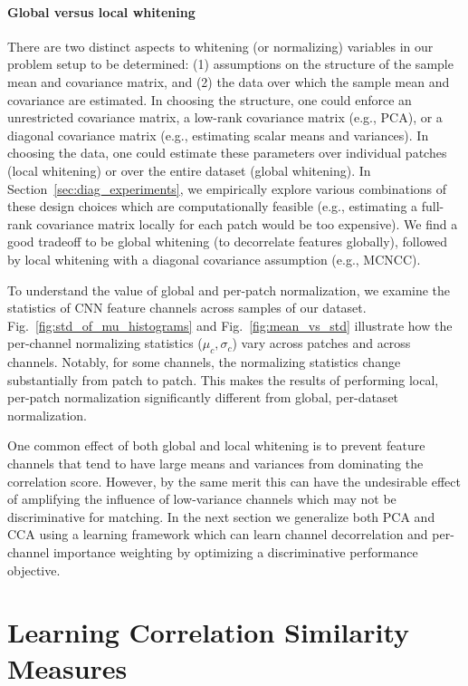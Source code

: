 \documentclass[twocolumn]{svjour3}           %
\begin{document}
\paragraph{Global versus local whitening}
There are two distinct aspects to whitening (or normalizing) variables in our
problem setup to be determined: (1) assumptions on the structure of the sample
mean and covariance matrix, and (2) the data over which the sample mean and
covariance are estimated. In choosing the structure, one could enforce an
unrestricted covariance matrix, a low-rank covariance matrix (e.g., PCA), or a
diagonal covariance matrix (e.g., estimating scalar means and variances).  In
choosing the data, one could estimate these parameters over individual patches
(local whitening) or over the entire dataset (global whitening). In
Section~\ref{sec:diag_experiments}, we empirically explore various combinations
of these design choices which are computationally feasible (e.g., estimating a
full-rank covariance matrix locally for each patch would be too expensive).  We
find a good tradeoff to be global whitening (to decorrelate features globally),
followed by local whitening with a diagonal covariance assumption (e.g.,
MCNCC).


To understand the value of global and per-patch normalization, we examine the
statistics of CNN feature channels across samples of our dataset.
Fig.~\ref{fig:std_of_mu_histograms} and Fig.~\ref{fig:mean_vs_std} illustrate
how the per-channel normalizing statistics ($\mu_c,\sigma_c$) vary across
patches and across channels. Notably, for some channels, the normalizing
statistics change substantially from patch to patch. This makes the results of
performing local, per-patch normalization significantly different from global,
per-dataset normalization.  

One common effect of both global and local whitening is to prevent feature
channels that tend to have large means and variances from dominating the
correlation score. However, by the same merit this can have the undesirable
effect of amplifying the influence of low-variance channels which may not be
discriminative for matching.  In the next section we generalize both PCA and
CCA using a learning framework which can learn channel decorrelation and
per-channel importance weighting by optimizing a discriminative performance
objective.


\section{Learning Correlation Similarity Measures}
\label{sec:learning}
\end{document}
